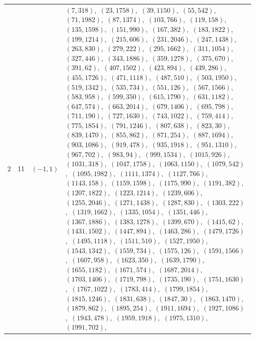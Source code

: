 \documentclass[11pt]{article}
\begin{document}
\begin{longtable}{@{}rrl>{\raggedright\arraybackslash}p{}@{}}
2 & 11 & $(-1,1)$ & $(7,318)$,\allowbreak\ $(23,1758)$,\allowbreak\ $(39,1150)$,\allowbreak\ $(55,542)$,\allowbreak\ $(71,1982)$,\allowbreak\ $(87,1374)$,\allowbreak\ $(103,766)$,\allowbreak\ $(119,158)$,\allowbreak\ $(135,1598)$,\allowbreak\ $(151,990)$,\allowbreak\ $(167,382)$,\allowbreak\ $(183,1822)$,\allowbreak\ $(199,1214)$,\allowbreak\ $(215,606)$,\allowbreak\ $(231,2046)$,\allowbreak\ $(247,1438)$,\allowbreak\ $(263,830)$,\allowbreak\ $(279,222)$,\allowbreak\ $(295,1662)$,\allowbreak\ $(311,1054)$,\allowbreak\ $(327,446)$,\allowbreak\ $(343,1886)$,\allowbreak\ $(359,1278)$,\allowbreak\ $(375,670)$,\allowbreak\ $(391,62)$,\allowbreak\ $(407,1502)$,\allowbreak\ $(423,894)$,\allowbreak\ $(439,286)$,\allowbreak\ $(455,1726)$,\allowbreak\ $(471,1118)$,\allowbreak\ $(487,510)$,\allowbreak\ $(503,1950)$,\allowbreak\ $(519,1342)$,\allowbreak\ $(535,734)$,\allowbreak\ $(551,126)$,\allowbreak\ $(567,1566)$,\allowbreak\ $(583,958)$,\allowbreak\ $(599,350)$,\allowbreak\ $(615,1790)$,\allowbreak\ $(631,1182)$,\allowbreak\ $(647,574)$,\allowbreak\ $(663,2014)$,\allowbreak\ $(679,1406)$,\allowbreak\ $(695,798)$,\allowbreak\ $(711,190)$,\allowbreak\ $(727,1630)$,\allowbreak\ $(743,1022)$,\allowbreak\ $(759,414)$,\allowbreak\ $(775,1854)$,\allowbreak\ $(791,1246)$,\allowbreak\ $(807,638)$,\allowbreak\ $(823,30)$,\allowbreak\ $(839,1470)$,\allowbreak\ $(855,862)$,\allowbreak\ $(871,254)$,\allowbreak\ $(887,1694)$,\allowbreak\ $(903,1086)$,\allowbreak\ $(919,478)$,\allowbreak\ $(935,1918)$,\allowbreak\ $(951,1310)$,\allowbreak\ $(967,702)$,\allowbreak\ $(983,94)$,\allowbreak\ $(999,1534)$,\allowbreak\ $(1015,926)$,\allowbreak\ $(1031,318)$,\allowbreak\ $(1047,1758)$,\allowbreak\ $(1063,1150)$,\allowbreak\ $(1079,542)$,\allowbreak\ $(1095,1982)$,\allowbreak\ $(1111,1374)$,\allowbreak\ $(1127,766)$,\allowbreak\ $(1143,158)$,\allowbreak\ $(1159,1598)$,\allowbreak\ $(1175,990)$,\allowbreak\ $(1191,382)$,\allowbreak\ $(1207,1822)$,\allowbreak\ $(1223,1214)$,\allowbreak\ $(1239,606)$,\allowbreak\ $(1255,2046)$,\allowbreak\ $(1271,1438)$,\allowbreak\ $(1287,830)$,\allowbreak\ $(1303,222)$,\allowbreak\ $(1319,1662)$,\allowbreak\ $(1335,1054)$,\allowbreak\ $(1351,446)$,\allowbreak\ $(1367,1886)$,\allowbreak\ $(1383,1278)$,\allowbreak\ $(1399,670)$,\allowbreak\ $(1415,62)$,\allowbreak\ $(1431,1502)$,\allowbreak\ $(1447,894)$,\allowbreak\ $(1463,286)$,\allowbreak\ $(1479,1726)$,\allowbreak\ $(1495,1118)$,\allowbreak\ $(1511,510)$,\allowbreak\ $(1527,1950)$,\allowbreak\ $(1543,1342)$,\allowbreak\ $(1559,734)$,\allowbreak\ $(1575,126)$,\allowbreak\ $(1591,1566)$,\allowbreak\ $(1607,958)$,\allowbreak\ $(1623,350)$,\allowbreak\ $(1639,1790)$,\allowbreak\ $(1655,1182)$,\allowbreak\ $(1671,574)$,\allowbreak\ $(1687,2014)$,\allowbreak\ $(1703,1406)$,\allowbreak\ $(1719,798)$,\allowbreak\ $(1735,190)$,\allowbreak\ $(1751,1630)$,\allowbreak\ $(1767,1022)$,\allowbreak\ $(1783,414)$,\allowbreak\ $(1799,1854)$,\allowbreak\ $(1815,1246)$,\allowbreak\ $(1831,638)$,\allowbreak\ $(1847,30)$,\allowbreak\ $(1863,1470)$,\allowbreak\ $(1879,862)$,\allowbreak\ $(1895,254)$,\allowbreak\ $(1911,1694)$,\allowbreak\ $(1927,1086)$,\allowbreak\ $(1943,478)$,\allowbreak\ $(1959,1918)$,\allowbreak\ $(1975,1310)$,\allowbreak\ $(1991,702)$,\allowbreak\ 
\end{longtable}
\end{document}
